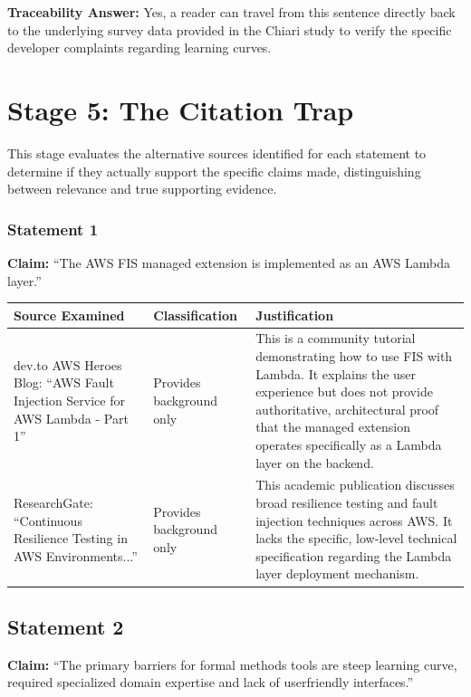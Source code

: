 \documentclass{article}
\begin{document}
\textbf{Traceability Answer:} Yes, a reader can travel from this sentence directly back to the underlying survey data provided in the Chiari study to verify the specific developer complaints regarding learning curves.




\newpage
\section*{Stage 5: The Citation Trap}
This stage evaluates the alternative sources identified for each statement to determine if they actually support the specific claims made, distinguishing between relevance and true supporting evidence.

\subsubsection*{Statement 1}
\textbf{Claim:} ``The AWS FIS managed extension is implemented as an AWS Lambda layer.''

\begin{table}[h!]
\centering
\renewcommand{\arraystretch}{1.5}
\begin{tabular}{|p{4.5cm}|p{3.5cm}|p{7cm}|}
\hline
\textbf{Source Examined} & \textbf{Classification} & \textbf{Justification} \\ \hline
dev.to AWS Heroes Blog: ``AWS Fault Injection Service for AWS Lambda - Part 1'' & Provides background only & This is a community tutorial demonstrating how to use FIS with Lambda. It explains the user experience but does not provide authoritative, architectural proof that the managed extension operates specifically as a Lambda layer on the backend. \\ \hline
ResearchGate: ``Continuous Resilience Testing in AWS Environments...'' & Provides background only & This academic publication discusses broad resilience testing and fault injection techniques across AWS. It lacks the specific, low-level technical specification regarding the Lambda layer deployment mechanism. \\ \hline
\end{tabular}
\end{table}

\subsection*{Statement 2}
\textbf{Claim:} ``The primary barriers for formal methods tools are steep learning curve, required specialized domain expertise and lack of userfriendly interfaces.''
\end{document}
